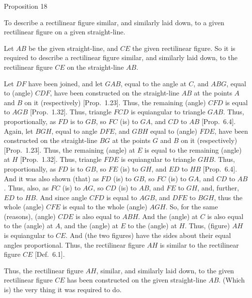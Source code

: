 \begin{center}
{\large Proposition 18}
\end{center}

To describe a rectilinear figure similar, and similarly laid down, to a
given rectilinear figure on a given straight-line.

\epsfysize=1.6in
\centerline{}

Let $AB$ be the given straight-line, and $CE$ the given rectilinear figure.
So it is required to describe a rectilinear figure similar, and similarly laid down,   to the rectilinear
figure $CE$ on the straight-line $AB$.

Let $DF$ have been joined, and let $GAB$, equal to the angle at $C$, and $ABG$,
equal to (angle) $CDF$, have been constructed  on the straight-line $AB$  
at the points $A$ and $B$ on it (respectively) [Prop.~1.23]. Thus, the
remaining (angle) $CFD$ is equal to $AGB$  [Prop.~1.32].
Thus, triangle $FCD$ is equiangular to triangle $GAB$. Thus, proportionally,
as $FD$ is to $GB$, so $FC$ (is) to $GA$, and $CD$ to $AB$ [Prop.~6.4]. Again, let $BGH$, equal to angle $DFE$,
and $GBH$ equal to (angle) $FDE$, have been constructed on the straight-line $BG$  at the points $G$ and
$B$ on it (respectively) [Prop.~1.23]. Thus, the
remaining (angle) at $E$ is equal to the remaining (angle) at $H$  [Prop.~1.32]. Thus, triangle $FDE$ is equiangular to triangle $GHB$.
Thus, proportionally, as $FD$ is to $GB$, so $FE$ (is) to $GH$, and $ED$ to 
$HB$ [Prop.~6.4]. And it was also
shown (that) as $FD$ (is) to $GB$, so $FC$ (is) to $GA$, and $CD$ to $AB$. Thus, also, as $FC$  (is) to $AG$, so  $CD$ (is) to $AB$, and $FE$ to $GH$, and, further, $ED$ to
$HB$. And since angle $CFD$ is equal to $AGB$, and $DFE$ to $BGH$, thus the
whole (angle) $CFE$ is equal to the whole (angle) $AGH$. So, for the same (reasons), (angle) $CDE$ is also equal to $ABH$. And the (angle) at $C$ is also equal to
the (angle) at $A$, and the (angle) at $E$ to the (angle) at $H$. Thus,  (figure) $AH$
is equiangular to $CE$. And (the two figures) have the sides about their equal angles
proportional. Thus, the rectilinear figure $AH$ is similar to the rectilinear figure
$CE$ [Def.~6.1].

Thus, the rectilinear figure $AH$, similar,  and similarly laid down, to the given rectilinear figure
$CE$ has been constructed on the given straight-line
$AB$. (Which is) the very thing it was required to do.


